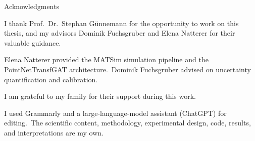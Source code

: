 \thispagestyle{empty}

\vspace*{20mm}

\begin{center}
 { Acknowledgments}
\end{center}

\vspace{10mm}

I thank Prof.\ Dr.\ Stephan G\"unnemann for the opportunity to work on this thesis, and my advisors Dominik Fuchsgruber and Elena Natterer for their valuable guidance.

\vspace{5mm}

Elena Natterer provided the MATSim simulation pipeline and the PointNetTransfGAT architecture.\ Dominik Fuchsgruber advised on uncertainty quantification and calibration.

\vspace{5mm}

I am grateful to my family for their support during this work.

\vspace{5mm}

I used Grammarly and a large-language-model assistant (ChatGPT) for editing.\ The scientific content, methodology, experimental design, code, results, and interpretations are my own.

\cleardoublepage{}
